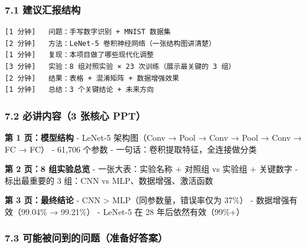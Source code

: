 \documentclass[
  11pt,
]{ctexart}
\begin{document}
\subsubsection{7.1
建议汇报结构}\label{ux5efaux8baeux6c47ux62a5ux7ed3ux6784}

\begin{verbatim}
[1 分钟]   问题：手写数字识别 + MNIST 数据集
[2 分钟]   方法：LeNet-5 卷积神经网络（一张结构图讲清楚）
[1 分钟]   复现：本项目做了哪些现代化调整
[3 分钟]   实验：8 组对照实验 × 23 次训练（展示最关键的 3 组）
[2 分钟]   结果：表格 + 混淆矩阵 + 数据增强效果
[1 分钟]   总结：3 个关键结论 + 未来方向
\end{verbatim}

\subsubsection{7.2 必讲内容（3 张核心
PPT）}\label{ux5fc5ux8bb2ux5185ux5bb93-ux5f20ux6838ux5fc3-ppt}

\textbf{第 1 页：模型结构} - LeNet-5 架构图（Conv → Pool → Conv → Pool →
Conv → FC → FC） - 61,706 个参数 - 一句话：卷积提取特征，全连接做分类

\textbf{第 2 页：8 组实验总览} - 一张大表：实验名称 + 对照组 vs 实验组 +
关键数字 - 标出最重要的 3 组：CNN vs MLP、数据增强、激活函数

\textbf{第 3 页：最终结论} - CNN \textgreater{}
MLP（同参数量，错误率仅为 37\%） - 数据增强有效（99.04\% → 99.21\%） -
LeNet-5 在 28 年后依然有效（99\%+）

\subsubsection{7.3
可能被问到的问题（准备好答案）}\label{ux53efux80fdux88abux95eeux5230ux7684ux95eeux9898ux51c6ux5907ux597dux7b54ux6848}
\end{document}
